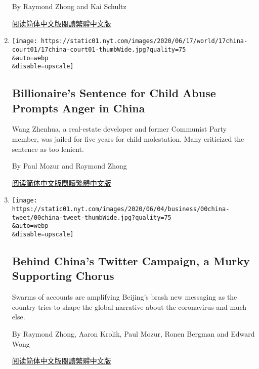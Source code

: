 \begin{enumerate}
  By Raymond Zhong and Kai Schultz

  \href{https://cn.nytimes.com/technology/20200701/india-china-tiktok/}{阅读简体中文版}\href{https://cn.nytimes.com/technology/20200701/india-china-tiktok/zh-hant/}{閱讀繁體中文版}
\item
  \href{/2020/06/17/world/asia/china-wang-zhenhua-sentence.html}{}

  \texttt{[image: https://static01.nyt.com/images/2020/06/17/world/17china-court01/17china-court01-thumbWide.jpg?quality=75\\\&auto=webp\\\&disable=upscale]}

  \hypertarget{billionaires-sentence-for-child-abuse-prompts-anger-in-china}{%
  \subsection{Billionaire's Sentence for Child Abuse Prompts Anger in
  China}\label{billionaires-sentence-for-child-abuse-prompts-anger-in-china}}

  Wang Zhenhua, a real-estate developer and former Communist Party
  member, was jailed for five years for child molestation. Many
  criticized the sentence as too lenient.

  By Paul Mozur and Raymond Zhong

  \href{https://cn.nytimes.com/china/20200618/china-wang-zhenhua-sentence/}{阅读简体中文版}\href{https://cn.nytimes.com/china/20200618/china-wang-zhenhua-sentence/z}{閱讀繁體中文版}
\item
  \href{/2020/06/08/technology/china-twitter-disinformation.html}{}

  \texttt{[image: https://static01.nyt.com/images/2020/06/04/business/00china-tweet/00china-tweet-thumbWide.jpg?quality=75\\\&auto=webp\\\&disable=upscale]}

  \hypertarget{behind-chinas-twitter-campaign-a-murky-supporting-chorus}{%
  \subsection{Behind China's Twitter Campaign, a Murky Supporting
  Chorus}\label{behind-chinas-twitter-campaign-a-murky-supporting-chorus}}

  Swarms of accounts are amplifying Beijing's brash new messaging as the
  country tries to shape the global narrative about the coronavirus and
  much else.

  By Raymond Zhong, Aaron Krolik, Paul Mozur, Ronen Bergman and Edward
  Wong

  \href{https://cn.nytimes.com/technology/20200609/china-twitter-disinformation/}{阅读简体中文版}\href{https://cn.nytimes.com/technology/20200609/china-twitter-disinformation/zh}{閱讀繁體中文版}
\end{enumerate}

